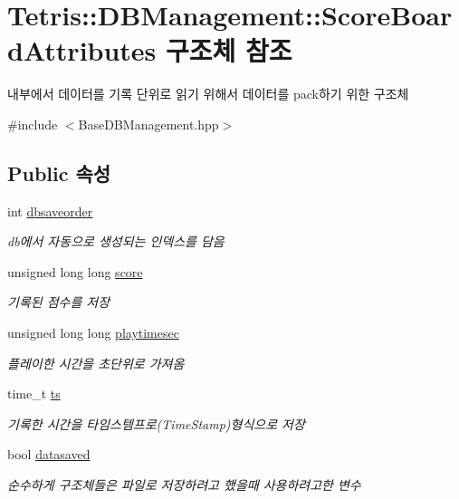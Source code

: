 \hypertarget{struct_tetris_1_1_d_b_management_1_1_score_board_attributes}{}\section{Tetris\+:\+:D\+B\+Management\+:\+:Score\+Board\+Attributes 구조체 참조}
\label{struct_tetris_1_1_d_b_management_1_1_score_board_attributes}


내부에서 데이터를 기록 단위로 읽기 위해서 데이터를 pack하기 위한 구조체  




{\ttfamily \#include $<$Base\+D\+B\+Management.\+hpp$>$}

\subsection*{Public 속성}
\begin{DoxyCompactItemize}
\item 
int \hyperlink{struct_tetris_1_1_d_b_management_1_1_score_board_attributes_a8fcc24de440dcae3e369df28485cde4d}{dbsaveorder}
\begin{DoxyCompactList}\small\item\em db에서 자동으로 생성되는 인덱스를 담음 \end{DoxyCompactList}\item 
unsigned long long \hyperlink{struct_tetris_1_1_d_b_management_1_1_score_board_attributes_acca4d00875cd210845e3ed2532ed276a}{score}
\begin{DoxyCompactList}\small\item\em 기록된 점수를 저장 \end{DoxyCompactList}\item 
unsigned long long \hyperlink{struct_tetris_1_1_d_b_management_1_1_score_board_attributes_a1534fca0e7a2795c055de645cba2ea18}{playtimesec}
\begin{DoxyCompactList}\small\item\em 플레이한 시간을 초단위로 가져옴 \end{DoxyCompactList}\item 
time\+\_\+t \hyperlink{struct_tetris_1_1_d_b_management_1_1_score_board_attributes_a79b3c0fb31de1f4fd878b90695480b75}{ts}
\begin{DoxyCompactList}\small\item\em 기록한 시간을 타임스템프로(\+Time\+Stamp)형식으로 저장 \end{DoxyCompactList}\item 
bool \hyperlink{struct_tetris_1_1_d_b_management_1_1_score_board_attributes_a0ac70e57809cf25a2b6a4c224a951497}{datasaved}
\begin{DoxyCompactList}\small\item\em 순수하게 구조체들은 파일로 저장하려고 했을때 사용하려고한 변수 \end{DoxyCompactList}\end{DoxyCompactItemize}


